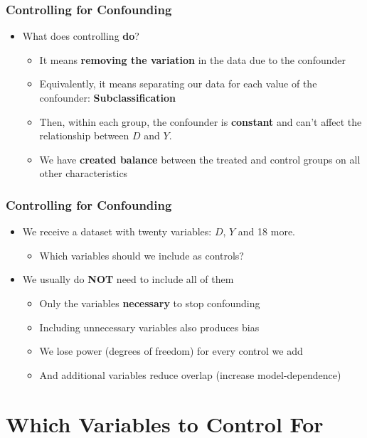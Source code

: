\documentclass[xcolor=x11names,compress]{beamer}\usepackage[]{graphicx}\usepackage[]{color}
\renewcommand{\(}{\begin{columns}}
\renewcommand{\)}{\end{columns}}
\newcommand{\<}[1]{\begin{column}{#1}}
\renewcommand{\>}{\end{column}}
\begin{document}
\begin{frame}
\frametitle{Controlling for Confounding}
\begin{itemize}
\item What does controlling \textbf{do}?
\begin{itemize}
\pause 
\item It means \textbf{removing the variation} in the data due to the confounder
\pause
\item Equivalently, it means separating our data for each value of the confounder: \textbf{Subclassification}
\pause
\item Then, within each group, the confounder is \textbf{constant} and can't affect the relationship between $D$ and $Y$.
\pause
\item We have \textbf{created balance} between the treated and control groups on all other characteristics
\end{itemize}
\end{itemize}
\end{frame}

\begin{frame}
\frametitle{Controlling for Confounding}
\begin{itemize}
\item We receive a dataset with twenty variables: $D$, $Y$ and 18 more. 
\begin{itemize}
\item Which variables should we include as controls?
\end{itemize}
\pause
\item We usually do \textbf{NOT} need to include all of them
\pause
\begin{itemize}
\item Only the variables \textbf{necessary} to stop confounding
\pause
\item Including unnecessary variables also produces bias
\pause
\item We lose power (degrees of freedom) for every control we add
\pause
\item And additional variables reduce overlap (increase model-dependence)
\pause
\end{itemize}
\end{itemize}
\end{frame}

\section{Which Variables to Control For}
\end{document}
